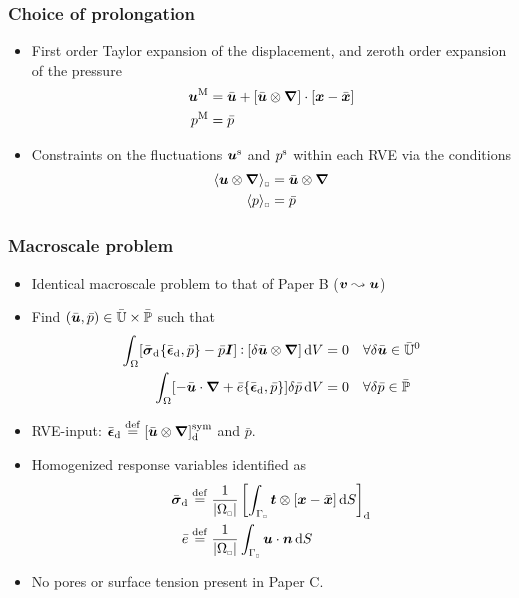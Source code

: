 \documentclass[11pt]{beamer} %
\DeclarePairedDelimiter{\homgen}{\langle}{\rangle_\rve}
\renewcommand{\dev}{\mathrm{d}}
\newcommand{\volume}{|\Omega_\rve|}
\newcommand{\rve}{
  {\mathchoice
   {\mbox{\scalebox{0.67}{$\Box$}}}
   {\mbox{\scalebox{0.67}{$\Box$}}}
   {\mbox{\scalebox{0.5}{$\Box$}}}
   {\mbox{\scalebox{0.375}{$\Box$}}}
  }
}
\begin{document}
\begin{frame}
 \frametitle{Choice of prolongation}
\begin{itemize}
 \item First order Taylor expansion of the displacement, and zeroth order expansion of the pressure
\begin{align*}
 \boldsymbol{u}^{\mathrm{M}} &= \bar{\boldsymbol{u}} + [\bar{\boldsymbol{u}}\mathbin{\otimes}\boldsymbol{\nabla}]\cdot[\boldsymbol{x} - \bar{\boldsymbol{x}}]
\\
 p^{\mathrm{M}} &= \bar{p}
\end{align*}
 \item Constraints on the fluctuations $\boldsymbol{u}^{\mathrm{s}}$ and $p^{\mathrm{s}}$ within each RVE via the conditions
\begin{align*}
 \homgen{\ta u\outerp\diff} &= \bar{\ta u}\outerp\diff
\\
 \homgen{p} &= \bar{p}
\end{align*}
\end{itemize}
\end{frame}

\begin{frame}
 \frametitle{Macroscale problem}
\begin{itemize}
 \item Identical macroscale problem to that of Paper B ($\boldsymbol{v}\leadsto\boldsymbol{u}$)
 \color{gray}
 \item Find $(\bar{\boldsymbol{u}}, \bar{p}) \in \bar{\mathbb{U}}\times \bar{\mathbb{P}}$ such that
 \begin{align*}
  \int_\Omega [{\bar{\ts\sigma}_\dev\{\bar{\ts\epsilon}_\dev, \bar{p}\}} - \bar{p}\ts I]\dprod[\delta\bar{\ta u}\outerp\diff]\dif V &= 0\quad \forall \delta\bar{\ta u} \in \bar{\set{U}}^0
\\
  \int_\Omega [-\bar{\ta u}\cdot\diff + {\bar{e}\{\bar{\ts\epsilon}_\dev, \bar{p}\}}]\delta\bar{p}\dif V &= 0\quad \forall \delta\bar{p} \in \bar{\set{P}}
 \end{align*}
 \item RVE-input: $\bar{\ts\epsilon}_\dev\defeq [\bar{\ta u}\outerp\diff]^\sym_\dev$ and $\bar{p}$.
 \item Homogenized response variables identified as
 \begin{align*}
 \bar{\ts\sigma}_\dev &\defeq \frac{1}{\volume} \left[\int_{\Gamma_\rve} \ta t \outerp [\ta x-\bar{\ta x}]\dif S\right]_\dev
\\
 \bar{e} &\defeq \frac{1}{\volume} \int_{\Gamma_\rve} \ta u \cdot \ta n\dif S
 \end{align*}
 \color{black}
 \item No pores or surface tension present in Paper C.
\end{itemize}
\end{frame}
\end{document}
